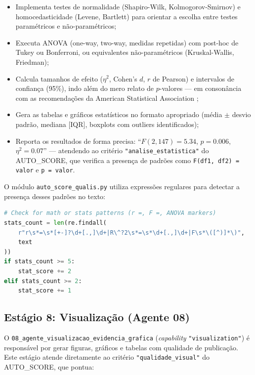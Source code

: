 \begin{itemize}
    \item Implementa testes de normalidade (Shapiro-Wilk,
    Kolmogorov-Smirnov) e homocedasticidade (Levene, Bartlett) para
    orientar a escolha entre testes paramétricos e não-paramétricos;

    \item Executa ANOVA (one-way, two-way, medidas repetidas) com
    post-hoc de Tukey ou Bonferroni, ou equivalentes não-paramétricos
    (Kruskal-Wallis, Friedman);

    \item Calcula tamanhos de efeito ($\eta^2$, Cohen's $d$, $r$ de
    Pearson) e intervalos de confiança (95\%), indo além do mero
    relato de $p$-valores — em consonância com as recomendações da
    American Statistical Association \cite{Wasserstein2016_ASA};

    \item Gera as tabelas e gráficos estatísticos no formato
    apropriado (média $\pm$ desvio padrão, mediana [IQR], boxplots
    com outliers identificados);

    \item Reporta os resultados de forma precisa: ``$F(2, 147) =
    5.34$, $p = 0.006$, $\eta^2 = 0.07$'' — atendendo ao critério
    \texttt{"analise\_estatistica"} do AUTO\_SCORE, que verifica a
    presença de padrões como \texttt{F(df1, df2) = valor} e
    \texttt{p = valor}.
\end{itemize}

O módulo \texttt{auto\_score\_qualis.py} utiliza expressões
regulares para detectar a presença desses padrões no texto:

\begin{lstlisting}[language=Python, caption={Detecção de padrões estatísticos no AUTO\_SCORE}, label={lst:regex_stats}]
# Check for math or stats patterns (r =, F =, ANOVA markers)
stats_count = len(re.findall(
    r"r\s*=\s*[+-]?\d+[.,]\d+|R\^?2\s*=\s*\d+[.,]\d+|F\s*\([^)]*\)",
    text
))
if stats_count >= 5:
    stat_score += 2
elif stats_count >= 2:
    stat_score += 1
\end{lstlisting}

\subsection{Estágio 8: Visualização (Agente 08)}
\label{sec:estagio8}

O \texttt{08\_agente\_visualizacao\_evidencia\_grafica}
(\textit{capability} \texttt{"visualization"}) é responsável por
gerar figuras, gráficos e tabelas com qualidade de publicação. Este
estágio atende diretamente ao critério
\texttt{"qualidade\_visual"} do AUTO\_SCORE, que pontua:

